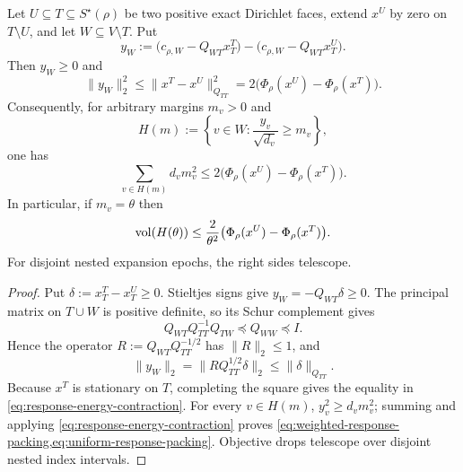 \begin{lemma}
\label{lem:response-energy-packing}
Let $U\subseteq T\subseteq S^\star(\rho)$ be two positive exact Dirichlet
faces, extend $x^U$ by zero on $T\setminus U$, and let
$W\subseteq V\setminus T$.  Put
\begin{equation}
 y_W
 :=\bigl(c_{\rho,W}-Q_{WT}x^T_T\bigr)
   -\bigl(c_{\rho,W}-Q_{WT}x^U_T\bigr).
 \label{eq:exterior-response-change}
\end{equation}
Then $y_W\geq0$ and
\begin{equation}
 \|y_W\|_2^2
 \leq\|x^T-x^U\|_{Q_{TT}}^2
 =2\bigl(\Phi_\rho(x^U)-\Phi_\rho(x^T)\bigr).
 \label{eq:response-energy-contraction}
\end{equation}
Consequently, for arbitrary margins $m_v>0$ and
\begin{equation*}
 H(m):=\left\{
  v\in W:\frac{y_v}{\sqrt{d_v}}\geq m_v
 \right\},
\end{equation*}
one has
\begin{equation}
 \sum_{v\in H(m)}d_vm_v^2
 \leq2\bigl(\Phi_\rho(x^U)-\Phi_\rho(x^T)\bigr).
 \label{eq:weighted-response-packing}
\end{equation}
In particular, if $m_v=\theta$ then
\begin{equation}
 \operatorname{vol}(H(\theta))
 \leq\frac{2}{\theta^2}
 \bigl(\Phi_\rho(x^U)-\Phi_\rho(x^T)\bigr).
 \label{eq:uniform-response-packing}
\end{equation}
For disjoint nested expansion epochs, the right sides telescope.
\end{lemma}

\begin{proof}
Put $\delta:=x^T_T-x^U_T\geq0$.  Stieltjes signs give
$y_W=-Q_{WT}\delta\geq0$.  The principal matrix on $T\cup W$ is positive
definite, so its Schur complement gives
\begin{equation*}
 Q_{WT}Q_{TT}^{-1}Q_{TW}\preceq Q_{WW}\preceq I.
\end{equation*}
Hence the operator
$R:=Q_{WT}Q_{TT}^{-1/2}$ has $\|R\|_2\leq1$, and
\begin{equation*}
 \|y_W\|_2
 =\|R Q_{TT}^{1/2}\delta\|_2
 \leq\|\delta\|_{Q_{TT}}.
\end{equation*}
Because $x^T$ is stationary on $T$, completing the square gives the equality
in \cref{eq:response-energy-contraction}.  For every $v\in H(m)$,
$y_v^2\geq d_vm_v^2$; summing and applying
\cref{eq:response-energy-contraction} proves
\cref{eq:weighted-response-packing,eq:uniform-response-packing}.  Objective
drops telescope over disjoint nested index intervals.
\end{proof}

